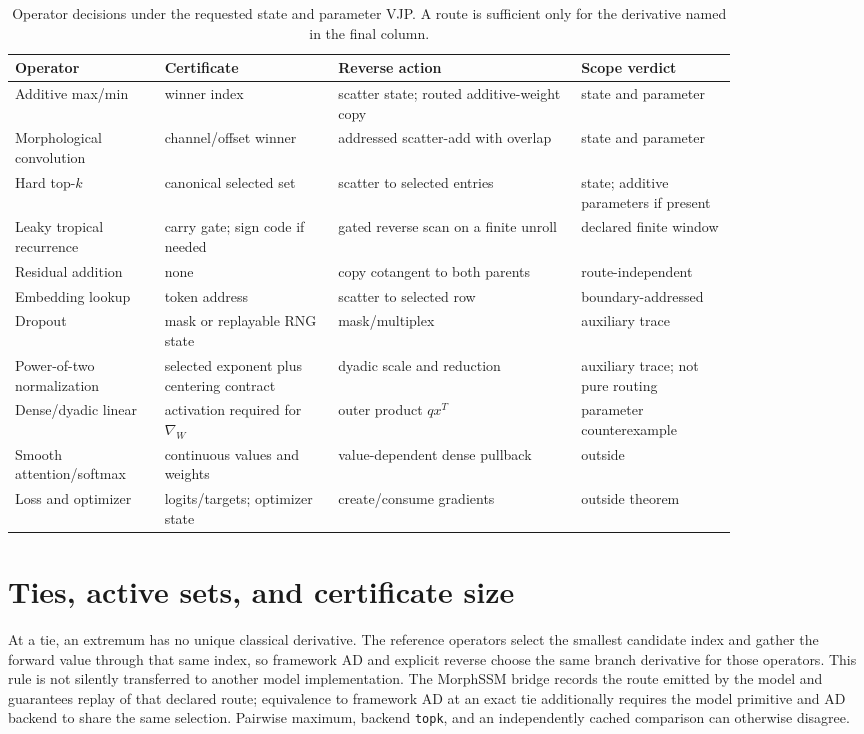 \documentclass[10pt]{article}
\newcommand{\code}[1]{\texttt{#1}}
\begin{document}
\begin{table}[t]
\centering
\caption{Operator decisions under the requested state and parameter VJP.  A
route is sufficient only for the derivative named in the final column.}
\label{tab:operators}
\small
\begin{tabular}{L{0.17\linewidth}L{0.20\linewidth}L{0.29\linewidth}L{0.18\linewidth}}
\toprule
Operator & Certificate & Reverse action & Scope verdict \\
\midrule
Additive max/min & winner index & scatter state; routed additive-weight copy & state and parameter \\
Morphological convolution & channel/offset winner & addressed scatter-add with overlap & state and parameter \\
Hard top-$k$ & canonical selected set & scatter to selected entries & state; additive parameters if present \\
Leaky tropical recurrence & carry gate; sign code if needed & gated reverse scan on a finite unroll & declared finite window \\
Residual addition & none & copy cotangent to both parents & route-independent \\
Embedding lookup & token address & scatter to selected row & boundary-addressed \\
Dropout & mask or replayable RNG state & mask/multiplex & auxiliary trace \\
Power-of-two normalization & selected exponent plus centering contract & dyadic scale and reduction & auxiliary trace; not pure routing \\
Dense/dyadic linear & activation required for $\nabla_W$ & outer product $qx^T$ & parameter counterexample \\
Smooth attention/softmax & continuous values and weights & value-dependent dense pullback & outside \\
Loss and optimizer & logits/targets; optimizer state & create/consume gradients & outside theorem \\
\bottomrule
\end{tabular}
\end{table}

\section{Ties, active sets, and certificate size}

At a tie, an extremum has no unique classical derivative.  The reference
operators select the smallest candidate index and gather the forward value
through that same index, so framework AD and explicit reverse choose the same
branch derivative for those operators.  This rule is not silently transferred
to another model implementation.  The MorphSSM bridge records the route emitted
by the model and guarantees replay of that declared route; equivalence to
framework AD at an exact tie additionally requires the model primitive and AD
backend to share the same selection.  Pairwise maximum, backend \code{topk},
and an independently cached comparison can otherwise disagree.
\end{document}
